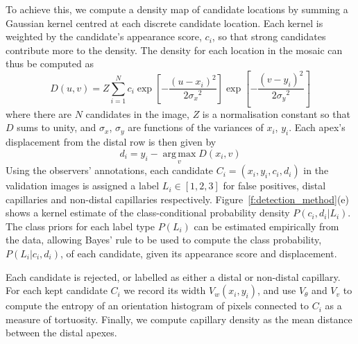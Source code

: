 \documentclass[runningheads,a4paper]{llncs}
\newcommand{\fref}[1]{Figure~\ref{#1}}
\begin{document}
To achieve this, we compute a density map of candidate locations by summing a Gaussian kernel centred at each discrete candidate location. Each kernel is weighted by the candidate's appearance score, $c_i$, so that strong candidates contribute more to the density. The density for each location in the mosaic can thus be computed as
%
\begin{equation}
D(u,v) = Z\sum\limits_{i=1}^N c_i\exp \left[ -\frac{(u-x_i)^2}{2{\sigma_x}^2}\right]\exp \left[ -\frac{(v-y_i)^2}{2{\sigma_y}^2}\right]
\label{e:kernel_estimate}
\end{equation}
where there are $N$ candidates in the image, $Z$ is a normalisation constant so that $D$ sums to unity, and $\sigma_x$, $\sigma_y$ are functions of the variances of $x_i$, $y_i$. Each apex's displacement from the distal row is then given by
%
\begin{equation}
d_i = y_i -  \operatorname*{arg\,max}_v D(x_i,v)
\label{e:candidate_displacment}
\end{equation}
%
Using the observers' annotations, each candidate $C_i=(x_i,y_i,c_i,d_i)$ in the validation images is assigned a label $L_i \in [1,2,3]$ for false positives, distal capillaries and non-distal capillaries respectively. \fref{f:detection_method}(e) shows a kernel estimate of the class-conditional probability density $P(c_i, d_i | L_i)$. The class priors for each label type $P(L_i)$ can be estimated empirically from the data, allowing Bayes' rule to be used to compute the class probability, $P(L_i | c_i, d_i)$, of each candidate, given its appearance score and displacement.

Each candidate is rejected, or labelled as either a distal or non-distal capillary. For each kept candidate $C_i$ we record its width $V_w(x_i,y_i)$, and use $V_\theta$ and $V_v$ to compute the entropy of an orientation histogram of pixels connected to $C_i$ as a measure of tortuosity. %
Finally, we compute capillary density as the mean distance between the distal apexes.
%
\end{document}
